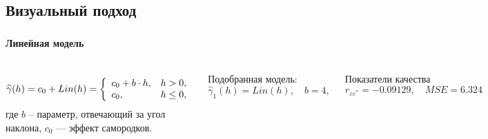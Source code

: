 \documentclass[10pt,pdf,aspectratio=169,hyperref={unicode},notheorems]{beamer}
\theoremstyle{definition}
\theoremstyle{example}
\theoremstyle{plain}
\begin{document}
\subsection{Визуальный подход}%

\begin{frame}
  \frametitle{\large\subsecname}
  \framesubtitle{Линейная модель}
  \begin{columns}[c]
  \column{3in}
  \begin{equation}\begin{gathered}
  \label{eq:lin}
    \widehat{\gamma}(h) = c_0 + Lin(h) = \left\{
   \begin{array}{l l}
     c_0 + b \cdot h, & h > 0, \\
     c_0, & h \leq 0,
   \end{array} \right.
  \end{gathered}\end{equation}
  где $ b $ -- параметр, отвечающий за угол наклона, $ c_0 $ --- эффект самородков.

  \vspace{0.5em}

  Подобранная модель:
  \begin{equation}
  \label{eq:gamma1}
    \widehat{\gamma}_1(h) = Lin(h), \quad b = 4,
  \end{equation}

  Показатели качества
  \begin{equation*}
    r_{\varepsilon\varepsilon^{*}} = -0.09129, \quad MSE = 6.324
  \end{equation*}


\end{columns}
\end{frame}
\end{document}
